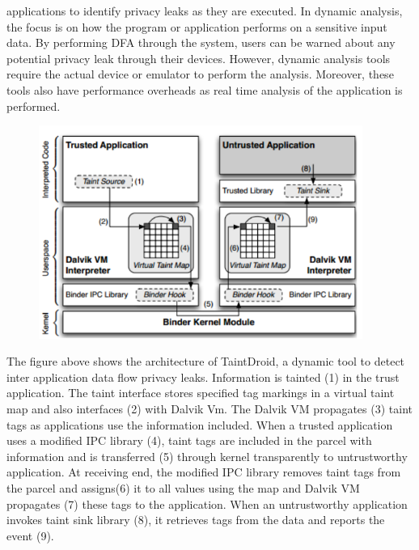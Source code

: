 \documentclass[12pt]{article}
\begin{document}
\begin{itemize}
        applications to identify privacy leaks as they are executed. In dynamic
        analysis, the focus is on how the program or application performs on
        a sensitive input data. By performing DFA through the system, users can
        be warned about any potential privacy leak through their devices.
        However, dynamic analysis tools require the actual device or emulator
        to perform the analysis. Moreover, these tools also have performance
        overheads as real time analysis of the application is performed.
        \begin{figure}[H]
            \centering
            \includegraphics[width=300pt]{TaintDroid.png}
        \end{figure}
        The figure above shows the architecture of TaintDroid, a dynamic
        tool to detect inter application data flow privacy leaks. Information
        is tainted (1) in the trust application. The taint interface
        stores specified tag markings in a virtual taint map and also
        interfaces (2) with Dalvik Vm. The Dalvik VM propagates (3)
        taint tags as applications use the information included. When
        a trusted application uses a modified IPC library (4), taint
        tags are included in the parcel with information and is
        transferred (5) through kernel transparently to untrustworthy
        application. At receiving end, the modified IPC library removes taint
        tags from the parcel and assigns(6) it to all values using the map and
        Dalvik VM propagates (7) these tags to the application. When an
        untrustworthy application invokes taint sink library (8), it
        retrieves tags from the data and reports the event (9).
\end{itemize}
\end{document}
